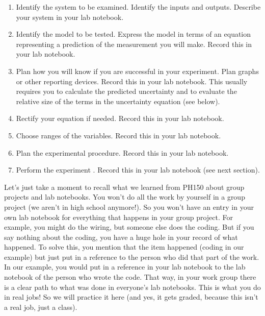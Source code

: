\begin{enumerate}
	\item Identify the system to be examined. Identify the inputs and outputs. Describe your system in your lab notebook.
	
	\item Identify the model to be tested. Express the model in terms of an equation representing a prediction of the measurement you will make. Record this in your lab notebook.
	
	\item Plan how you will know if you are successful in your experiment. Plan graphs or other reporting devices. Record this in your lab notebook. This usually requires you to calculate the predicted uncertainty and to evaluate the relative size of the terms in the uncertainty equation (see below).
	
	\item Rectify your equation if needed. Record this in your lab notebook.
	
	\item Choose ranges of the variables. Record this in your lab notebook.
	
	\item Plan the experimental procedure. Record this in your lab notebook.
	
	\item Perform the experiment . Record this in your lab notebook (see next section).
\end{enumerate}

Let's just take a moment to recall what we learned from PH150 about group projects and lab notebooks.  You won't do all the work by yourself in a group project (we aren't in high school anymore!).  So you won't have an entry in your own lab notebook for everything that happens in your group project. For example, you might do the wiring, but someone else does the coding.  But if you say nothing about the coding, you have a huge hole in your record of what happened.  To solve this, you mention that the item happened (coding in our example) but just put in a reference to the person who did that part of the work.  In our example, you would put in a reference in your lab notebook to the lab notebook of the person who wrote the code.  That way, in your work group there is a clear path to what was done in everyone's lab notebooks.  This is what you do in real jobs!  So we will practice it here (and yes, it gets graded, because this isn't a real job, just a class).

